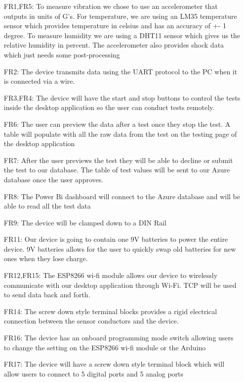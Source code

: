 \documentclass[12pt, titlepage]{article}
\begin{document}
\begin{itemize}
  \item[FR1,FR5:] To measure vibration we chose to use an accelerometer that outputs in units of G's. For temperature, we are using an LM35 temperature sensor which provides temperature in celsius and has an accuracy of +- 1 degree. To measure humidity we are using a DHT11 sensor which gives us the relative humidity in percent. The accelerometer also provides shock data which just needs some post-processing
  \item[FR2:] The device transmits data using the UART protocol to the PC when it is connected via a wire.
  \item[FR3,FR4:] The device will have the start and stop buttons to control the tests inside the desktop application so the user can conduct tests remotely.
  \item[FR6:] The user can preview the data after a test once they stop the test. A table will populate with all the raw data from the test on the testing page of the desktop application
  \item[FR7:] After the user previews the test they will be able to decline or submit the test to our database. The table of test values will be sent to our Azure database once the user approves.
  \item[FR8:] The Power Bi dashboard will connect to the Azure database and will be able to read all the test data
  \item[FR9:] The device will be clamped down to a DIN Rail
  \item[FR11:] Our device is going to contain one 9V batteries to power the entire device. 9V batteries allows for the user to quickly swap old batteries for new ones when they lose charge.
  \item[FR12,FR15:] The ESP8266 wi-fi module allows our device to wirelessly communicate with our desktop application through Wi-Fi. TCP will be used to send data back and forth.
  \item[FR14:] The screw down style terminal blocks provides a rigid electrical connection between the sensor conductors and the device.
  \item[FR16:]  The device has an onboard programming mode switch allowing users to change the setting on the ESP8266 wi-fi module or the Arduino 
  \item[FR17:] The device will have a screw down style terminal block which will allow users to connect to 5 digital ports and 5 analog ports      
  
\end{itemize}
\end{document}
